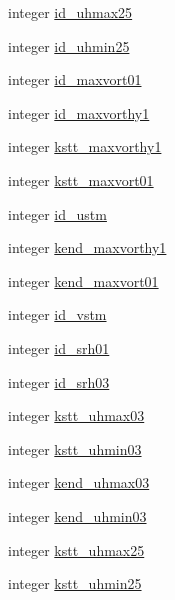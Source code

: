 \begin{DoxyCompactItemize}
\item 
integer \hyperlink{classfv__nggps__diags__mod_a8380e83c77a5d69766a8b48f53f632ba}{id\-\_\-uhmax25}
\item 
integer \hyperlink{classfv__nggps__diags__mod_a846858aba1610f7019bf8ccfa5a180d5}{id\-\_\-uhmin25}
\item 
integer \hyperlink{classfv__nggps__diags__mod_a2d7cc1ed40321df218306e01db6c6421}{id\-\_\-maxvort01}
\item 
integer \hyperlink{classfv__nggps__diags__mod_a7d134cd1a19c9f09f5b09c792998661c}{id\-\_\-maxvorthy1}
\item 
integer \hyperlink{classfv__nggps__diags__mod_a31273860fe6f1bc0bdd3a07768388d7d}{kstt\-\_\-maxvorthy1}
\item 
integer \hyperlink{classfv__nggps__diags__mod_a319a895968b7632a1affa7d179dc7014}{kstt\-\_\-maxvort01}
\item 
integer \hyperlink{classfv__nggps__diags__mod_a0a344ad39e04d91a5681074202f28f33}{id\-\_\-ustm}
\item 
integer \hyperlink{classfv__nggps__diags__mod_a657cc9bef8d0085fd26b49e3bf52caae}{kend\-\_\-maxvorthy1}
\item 
integer \hyperlink{classfv__nggps__diags__mod_a2e2ed0bad30f5dd6f820947195e645ae}{kend\-\_\-maxvort01}
\item 
integer \hyperlink{classfv__nggps__diags__mod_aea5bfa0a2e46ae23d8607bdd9bb3564b}{id\-\_\-vstm}
\item 
integer \hyperlink{classfv__nggps__diags__mod_ab0239911c83229042619225d7dd71493}{id\-\_\-srh01}
\item 
integer \hyperlink{classfv__nggps__diags__mod_a845db491df47731200e2a56e8baafc1a}{id\-\_\-srh03}
\item 
integer \hyperlink{classfv__nggps__diags__mod_ad0ea5ae698cef5167c7fdbd41efe192c}{kstt\-\_\-uhmax03}
\item 
integer \hyperlink{classfv__nggps__diags__mod_ae746952c86b8fd6dc88b35f8809c979d}{kstt\-\_\-uhmin03}
\item 
integer \hyperlink{classfv__nggps__diags__mod_a48ae4373e398c796a19a6a13a5e8e3bc}{kend\-\_\-uhmax03}
\item 
integer \hyperlink{classfv__nggps__diags__mod_a66ef8543a0e87256fcb41ab221f5bf9a}{kend\-\_\-uhmin03}
\item 
integer \hyperlink{classfv__nggps__diags__mod_ad33734413c2cfcb6c3a253206a9f0b7a}{kstt\-\_\-uhmax25}
\item 
integer \hyperlink{classfv__nggps__diags__mod_a73ee0ca4c35514c00e2da4dee53907e7}{kstt\-\_\-uhmin25}

\end{DoxyCompactItemize}

